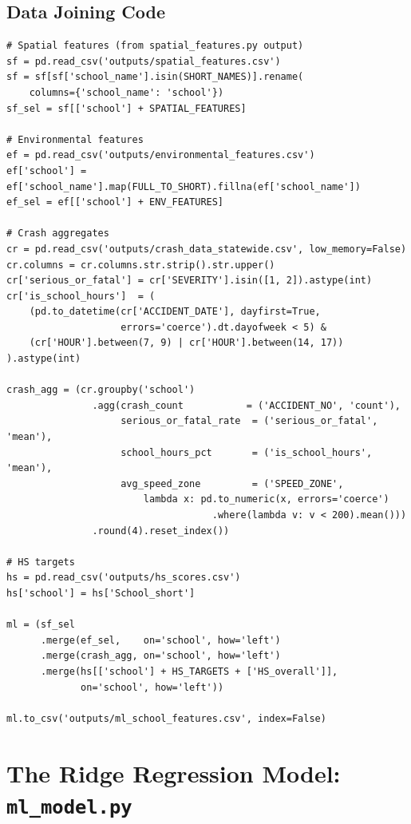 \documentclass[11pt,a4paper,openany]{book}
\begin{document}
\subsection{Data Joining Code}

\begin{lstlisting}[style=python, caption={Feature matrix assembly in feature\_engineering.py.}]
# Spatial features (from spatial_features.py output)
sf = pd.read_csv('outputs/spatial_features.csv')
sf = sf[sf['school_name'].isin(SHORT_NAMES)].rename(
    columns={'school_name': 'school'})
sf_sel = sf[['school'] + SPATIAL_FEATURES]

# Environmental features
ef = pd.read_csv('outputs/environmental_features.csv')
ef['school'] = ef['school_name'].map(FULL_TO_SHORT).fillna(ef['school_name'])
ef_sel = ef[['school'] + ENV_FEATURES]

# Crash aggregates
cr = pd.read_csv('outputs/crash_data_statewide.csv', low_memory=False)
cr.columns = cr.columns.str.strip().str.upper()
cr['serious_or_fatal'] = cr['SEVERITY'].isin([1, 2]).astype(int)
cr['is_school_hours']  = (
    (pd.to_datetime(cr['ACCIDENT_DATE'], dayfirst=True,
                    errors='coerce').dt.dayofweek < 5) &
    (cr['HOUR'].between(7, 9) | cr['HOUR'].between(14, 17))
).astype(int)

crash_agg = (cr.groupby('school')
               .agg(crash_count           = ('ACCIDENT_NO', 'count'),
                    serious_or_fatal_rate  = ('serious_or_fatal', 'mean'),
                    school_hours_pct       = ('is_school_hours', 'mean'),
                    avg_speed_zone         = ('SPEED_ZONE',
                        lambda x: pd.to_numeric(x, errors='coerce')
                                    .where(lambda v: v < 200).mean()))
               .round(4).reset_index())

# HS targets
hs = pd.read_csv('outputs/hs_scores.csv')
hs['school'] = hs['School_short']

ml = (sf_sel
      .merge(ef_sel,    on='school', how='left')
      .merge(crash_agg, on='school', how='left')
      .merge(hs[['school'] + HS_TARGETS + ['HS_overall']],
             on='school', how='left'))

ml.to_csv('outputs/ml_school_features.csv', index=False)
\end{lstlisting}

\section{The Ridge Regression Model: \texttt{ml\_model.py}}
\end{document}
